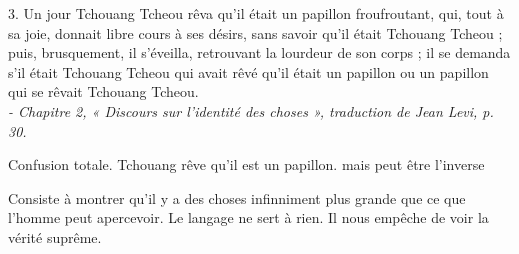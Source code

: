   \begin{singlequote}
      3. Un jour Tchouang Tcheou rêva qu’il était un papillon froufroutant, qui, tout à sa joie, donnait  libre cours à ses désirs, sans savoir qu’il était Tchouang Tcheou ; puis, brusquement, il s’éveilla, retrouvant la lourdeur de son corps ; il se demanda s’il était Tchouang Tcheou qui avait rêvé qu’il était un papillon ou un papillon qui se rêvait Tchouang Tcheou.  \\
      \textit{\small - Chapitre 2, « Discours sur l’identité des choses », traduction de Jean Levi, p. 30.}
  \end{singlequote}

  Confusion totale. Tchouang rêve qu'il est un papillon. mais peut être l'inverse

  Consiste à montrer qu'il y a des choses infinniment plus grande que ce que l'homme peut apercevoir. Le langage ne sert à rien. Il nous empêche de voir la vérité suprême.
    
